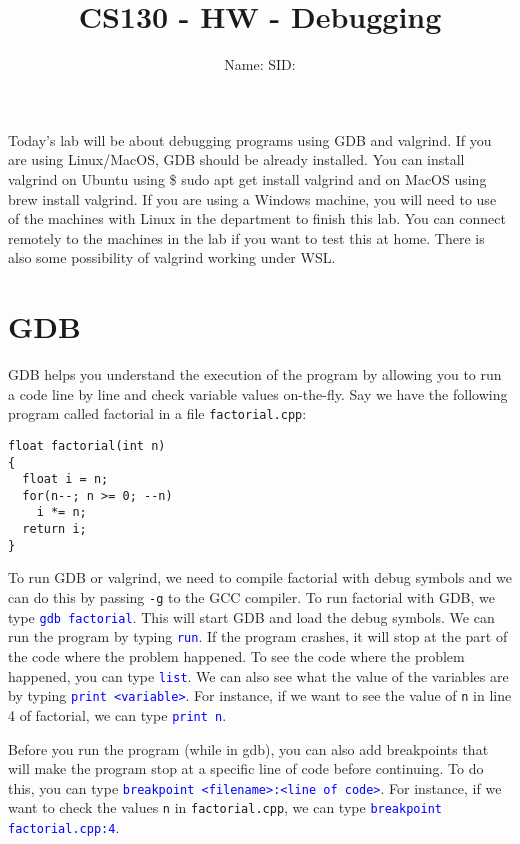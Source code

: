 \documentclass[12pt]{article}
\newcounter{problem}
\newcommand{\TODOL}[1]{\textcolor{red}{\underline{\hspace{#1 cm}}}}
\begin{document}
\title{CS130 - HW - Debugging}
\date{}
\author{Name: \TODOL7\qquad\qquad SID: \TODOL4}
\maketitle
\begin{center}
\end{center}

\newcommand{\CM}[1]{\textcolor{blue}{\texttt{#1}}}

Today's lab will be about debugging programs using GDB and valgrind. If you are
using Linux/MacOS, GDB should be already installed. You can install valgrind on
Ubuntu using \$ sudo apt get install valgrind and on MacOS using brew install
valgrind. If you are using a Windows machine, you will need to use of the
machines with Linux in the department to finish this lab.  You can connect
remotely to the machines in the lab if you want to test this at home.  There is
also some possibility of valgrind working under WSL.

\section{GDB}

GDB helps you understand the execution of the program by allowing you to run a
code line by line and check variable values on-the-fly. Say we have the
following program called factorial in a file \texttt{factorial.cpp}:

\begin{lstlisting}
float factorial(int n)
{
  float i = n;
  for(n--; n >= 0; --n)
    i *= n;
  return i;
}
\end{lstlisting}

To run GDB or valgrind, we need to compile factorial with debug symbols and we
can do this by passing \texttt{-g} to the GCC compiler.  To run factorial with
GDB, we type \CM{gdb factorial}.  This will start GDB and load the debug symbols. We
can run the program by typing \CM{run}. If the program crashes, it will stop at the
part of the code where the problem happened. To see the code where the problem
happened, you can type \CM{list}. We can also see what the value of the variables are
by typing \CM{print <variable>}.  For instance, if we want to see the value
of \texttt{n} in line 4 of factorial, we can type \CM{print n}.

Before you run the program (while in gdb), you can also add breakpoints that will make the
program stop at a specific line of code before continuing.  To do this, you can
type \CM{breakpoint <filename>:<line of code>}. For instance, if we
want to check the values \texttt{n} in \texttt{factorial.cpp}, we can type
\CM{breakpoint factorial.cpp:4}.
\end{document}
